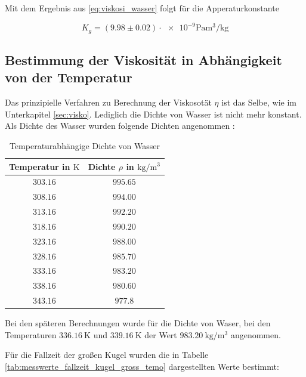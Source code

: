 Mit dem Ergebnis aus \eqref{eq:viskosi_wasser} folgt für die 
Apperaturkonstante

\begin{equation}
\label{eq:app_konst_gross}
K_{g}=\left(\num{9.98}\pm\num{0.02}\right)\cdot{\num{e-9}} \si{\pascal\cubic\meter\per\kilogram}
\end{equation}

\subsection{Bestimmung der Viskosität in Abhängigkeit von der Temperatur}

Das prinzipielle Verfahren zu Berechnung der Viskosotät $\eta$ ist
das Selbe, wie im Unterkapitel \ref{sec:visko}.
Lediglich die Dichte von Wasser ist nicht mehr konstant.
Als Dichte des Wasser wurden folgende Dichten angenommen \cite{lit_dichte}:  %

\begin{table}
\centering
\begin{tabular} {cc}
  \toprule
  Temperatur in $\si{\kelvin}$ & Dichte $\rho$ in $\si{\kilogram\per\cubic\meter}$ \\
  \midrule
  $\num{303.16}$ &$\num{995.65}$ \\
  $\num{308.16}$ &$\num{994.00}$\\
  $\num{313.16}$ &$\num{992.20}$\\
  $\num{318.16}$ &$\num{990.20}$\\
  $\num{323.16}$ &$\num{988.00}$\\
  $\num{328.16}$ &$\num{985.70}$\\
  $\num{333.16}$ &$\num{983.20}$\\
  $\num{338.16}$ &$\num{980.60}$\\
  $\num{343.16}$ &$\num{977.8}$\\
\bottomrule
\end{tabular}
\caption{Temperaturabhängige Dichte von Wasser}
\label{tab:dichtewasser}
\end{table}

Bei den späteren Berechnungen wurde für die Dichte von Waser, bei den Temperaturen $\SI{336.16}{\kelvin}$ und $\SI{339.16}{\kelvin}$ 
der Wert $\SI{983.20}{\kilogram\per\cubic\meter}$ angenommen.

Für die Fallzeit der großen Kugel wurden die in Tabelle \ref{tab:messwerte_fallzeit_kugel_gross_temo}
dargestellten Werte bestimmt:

